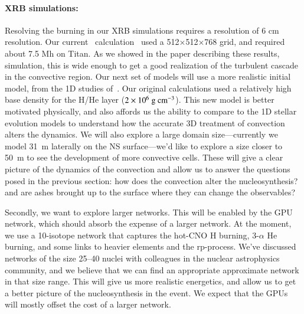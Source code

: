 \paragraph{XRB simulations: } Resolving the burning in our XRB simulations requires
a resolution of 6 cm resolution.  Our current
\maestro\ calculation~\cite{xrb-3d} used a 512$\times$512$\times$768
grid, and required about 7.5 Mh on Titan.  As we showed in the paper
describing these results, simulation, this is wide enough to get a
good realization of the turbulent cascade in the convective region.
Our next set of models will use a more realistic initial model, from
the 1D studies of~\cite{woosley:2004}.  Our original calculations used
a relatively high base density for the H/He layer ($2\times
10^6~{\mathrm{g~cm^{-3}}}$).  This new model is better motivated physically, and also
affords us the ability to compare to the 1D stellar evolution models
to understand how the accurate 3D treatment of convection alters the
dynamics.  We will also explore a large domain size---currently we
model 31~m laterally on the NS surface---we'd like to
explore a size closer to 50~m to see the development of more
convective cells.  These will give a clear picture of the dynamics of
the convection and allow us to answer the questions posed in the
previous section: how does the convection alter the nucleosynthesis?
and are ashes brought up to the surface where they can change the
observables?

Secondly, we want to explore larger networks.  This will be enabled by
the GPU network, which should absorb the expense of a larger network.
At the moment, we use a 10-isotope network that captures the hot-CNO H
burning, 3-$\alpha$ He burning, and some links to heavier elements and
the rp-process.  We've discussed networks of the size 25--40 nuclei
with colleagues in the nuclear astrophysics community, and we believe
that we can find an appropriate approximate network in that size
range.  This will give us more realistic energetics, and allow us to
get a better picture of the nucleosynthesis in the event.  We expect that
the GPUs will mostly offset the cost of a larger network.

